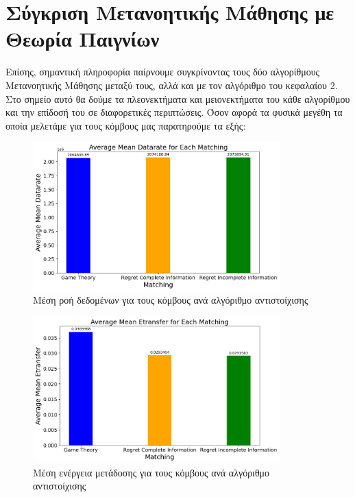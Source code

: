 \newpage

\section{Σύγκριση Μετανοητικής Μάθησης με Θεωρία Παιγνίων}

Επίσης, σημαντική πληροφορία παίρνουμε συγκρίνοντας τους δύο αλγορίθμους Μετανοητικής Μάθησης μεταξύ τους, αλλά και με τον αλγόριθμο του κεφαλαίου 2. Στο σημείο αυτό θα δούμε τα πλεονεκτήματα και μειονεκτήματα του κάθε αλγορίθμου και την επίδοσή του σε διαφορετικές περιπτώσεις. Όσον αφορά τα φυσικά μεγέθη τα οποία μελετάμε για τους κόμβους μας παρατηρούμε τα εξής:

\begin{figure}[H]
    \centering
    \includegraphics[width=0.85\textwidth]{figures/chapter4/Average_Mean_Datarate.png}
    \caption{Μέση ροή δεδομένων για τους κόμβους ανά αλγόριθμο αντιστοίχισης}
    \label{fig23}
\end{figure}

\begin{figure}[H]
    \centering
    \includegraphics[width=0.85\textwidth]{figures/chapter4/Average_Mean_Etransfer.png}
    \caption{Μέση ενέργεια μετάδοσης για τους κόμβους ανά αλγόριθμο αντιστοίχισης}
    \label{fig24}
\end{figure}

